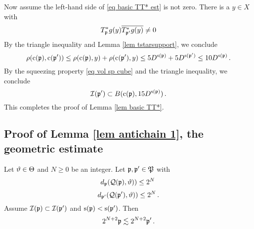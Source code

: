 {Now assume the left-hand side of \eqref{eq basic TT* est} is not zero.
There is a $y\in X$ with
\begin{equation}
    T^*_{\mathfrak p}g(y)\overline{T^*_{\mathfrak p'}g(y)}\neq 0
\end{equation}
By the triangle inequality and Lemma \ref{lem tstarsupport}, we conclude
\begin{equation}
   \rho(\mathrm{c}(\mathfrak p),\mathrm{c}(\mathfrak p'))\le  \rho(\mathrm{c}(\mathfrak p),y) +\rho(\mathrm{c}(\mathfrak p'),y)
   \le 5D^{\mathrm{s}(\mathfrak p)}+5D^{\mathrm{s}(\mathfrak p')}\le 10 D^{\mathrm{s}(\mathfrak p)}\, .
\end{equation}
By the squeezing property \eqref{eq vol sp cube} and the triangle inequality,
we conclude
\begin{equation}
    \mathcal{I}(\mathfrak p') \subset B(\mathrm{c}(\mathfrak p), 15D^{\mathrm{s}(\mathfrak p)})\, .
\end{equation}
   This completes the proof of Lemma  \ref{lem basic TT*}.





\subsection{Proof of Lemma \ref{lem antichain 1}, the geometric estimate}
\label{subsec geolem}


\begin{lemma}\label{lem a geo}
Let $\vartheta\in \Theta$ and $N\ge0$ be an integer.
Let $\mathfrak p, \mathfrak p'\in \mathfrak P$ with
\begin{equation}\label{eqassumedismfa}
    d_{\mathfrak p}(\mathcal{Q}(\mathfrak p), \vartheta))\le 2^N\,
\end{equation}
\begin{equation}\label{eqassumedismfap}
    d_{\mathfrak p'}(\mathcal{Q}(\mathfrak p'), \vartheta))\le 2^N\, .
\end{equation}
Assume $\mathcal{I}(\mathfrak p)\subset \mathcal{I}(\mathfrak p')$ and $\mathrm{s}(\mathfrak p)<\mathrm{s}(\mathfrak p')$.
Then
\begin{equation}\label{lp'lp''}2^{N+2}\mathfrak p\lesssim 2^{N+2} \mathfrak p'\, .
\end{equation}
\end{lemma}

}
